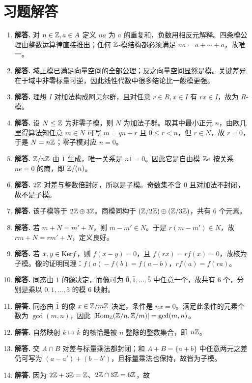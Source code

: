 \section*{习题解答}
\begin{enumerate}[label=\textbf{\arabic*.}, leftmargin=*, itemsep=1em]
\item \textbf{解答.} 对 $n\in \mathbb{Z},a\in A$ 定义 $na$ 为 $a$ 的重复和，负数用相反元解释。四条模公理由整数运算律直接推出；任何 $\mathbb{Z}$-模结构都必须满足 $na=a+\cdots+a$，故唯一。
\item \textbf{解答.} 域上模已满足向量空间的全部公理；反之向量空间显然是模。关键差异在于域中非零标量可逆，因此线性代数中很多结论比一般模更强。
\item \textbf{解答.} 理想 $I$ 对加法构成阿贝尔群，且对任意 $r\in R,x\in I$ 有 $rx\in I$，故为 $R$-模。
\item \textbf{解答.} 设 $N\le \mathbb{Z}$ 为非零子模，则 $N$ 为加法子群。取其中最小正元 $n$，由欧几里得算法知任意 $m\in N$ 可写 $m=qn+r$ 且 $0\le r<n$，但 $r\in N$，故 $r=0$，于是 $N=n\mathbb{Z}$；零子模对应 $n=0$。
\item \textbf{解答.} $\mathbb{Z}/n\mathbb{Z}$ 由 $\bar 1$ 生成，唯一关系是 $n\bar 1=0$。因此它是自由模 $\mathbb{Z} e$ 按关系 $ne=0$ 的商，即 $\mathbb{Z}/(n)$。
\item \textbf{解答.} $2\mathbb{Z}$ 对差与整数倍封闭，所以是子模。奇数集不含 $0$ 且对加法不封闭，故不是子模。
\item \textbf{解答.} 该子模等于 $2\mathbb{Z}\oplus 3\mathbb{Z}$。商模同构于 $(\mathbb{Z}/2\mathbb{Z})\oplus(\mathbb{Z}/3\mathbb{Z})$，共有 $6$ 个元素。
\item \textbf{解答.} 若 $m+N=m'+N$，则 $m-m'\in N$。于是 $r(m-m')\in N$，故 $rm+N=rm'+N$，定义良好。
\item \textbf{解答.} 若 $x,y\in \mathrm{Ker} f$，则 $f(x-y)=0$，且 $f(rx)=rf(x)=0$，故核为子模。像的证明同理：$f(a)-f(b)=f(a-b)$，$rf(a)=f(ra)$。
\item \textbf{解答.} 同态由 $1$ 的像决定，而像可为 $\bar 0,\bar1,\dots,\bar5$ 中任意一个，故共有 $6$ 个，分别是乘以 $0,1,\dots,5$ 的模 $6$ 映射。
\item \textbf{解答.} 同态由 $\bar1$ 的像 $x\in \mathbb{Z}/m\mathbb{Z}$ 决定，条件是 $n x=0$。满足此条件的元素个数为 $\gcd(m,n)$，因此 $|\mathrm{Hom}_{\mathbb{Z}}(\mathbb{Z}/n,\mathbb{Z}/m)|=\gcd(m,n)$。
\item \textbf{解答.} 自然映射 $k\mapsto \bar k$ 的核恰是被 $n$ 整除的整数集合，即 $n\mathbb{Z}$。
\item \textbf{解答.} 交 $A\cap B$ 对差与标量乘法都封闭；和 $A+B=\{a+b\}$ 中任意两元之差仍可写为 $(a-a')+(b-b')$，且标量乘法也保持，故皆为子模。
\item \textbf{解答.} 因为 $2\mathbb{Z}+3\mathbb{Z}=\mathbb{Z}$、$2\mathbb{Z}\cap 3\mathbb{Z}=6\mathbb{Z}$，故

\end{enumerate}
